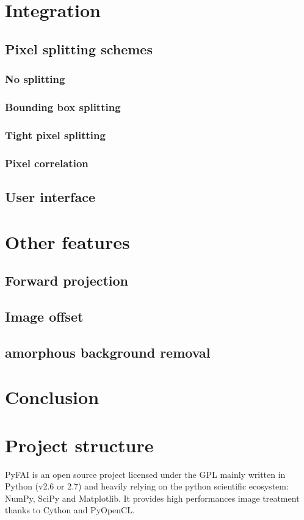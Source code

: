 \documentclass[preprint]{iucr}
\begin{document}
\section{Integration}
\subsection{Pixel splitting schemes}
\subsubsection{No splitting}
\subsubsection{Bounding box splitting}
\subsubsection{Tight pixel splitting}
\subsubsection{Pixel correlation}
\subsection{User interface}
\section{Other features}
\subsection{Forward projection}
\subsection{Image offset}
\subsection{amorphous background removal}

\section{Conclusion}






\appendix
\section{Project structure}
PyFAI is an open source project licensed under the GPL mainly written in Python (v2.6 or 2.7) 
and heavily relying on the python scientific ecosystem: NumPy, SciPy and Matplotlib. 
It provides high performances image treatment thanks to Cython and PyOpenCL.
\end{document}

